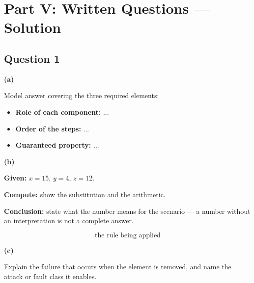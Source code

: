 %

\section*{Part V: Written Questions --- Solution}

\subsection*{Question 1}

\textbf{(a)}
\begin{ans}
Model answer covering the three required elements:
\begin{itemize}
    \item \textbf{Role of each component:} ...
    \item \textbf{Order of the steps:} ...
    \item \textbf{Guaranteed property:} ...
\end{itemize}
\end{ans}

\textbf{(b)}
\begin{ans}
\textbf{Given:} $x = 15$, $y = 4$, $z = 12$.

\textbf{Compute:} show the substitution and the arithmetic.

\textbf{Conclusion:} state what the number means for the scenario ---
a number without an interpretation is not a complete answer.
\end{ans}

\begin{keypoint}[Formula]
$$ \text{the rule being applied} $$
\end{keypoint}

\textbf{(c)}
\begin{ans}
Explain the failure that occurs when the element is removed, and name the
attack or fault class it enables.
\end{ans}

